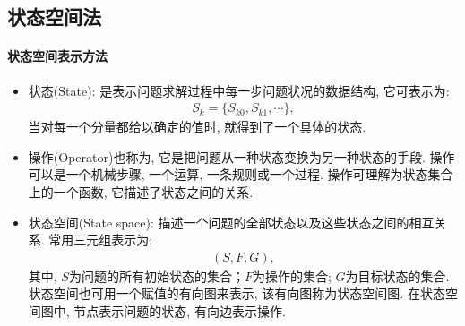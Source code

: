 \subsection{状态空间法}
\paragraph{状态空间表示方法}
\begin{itemize}
\item 状态(State): 是表示问题求解过程中每一步问题状况的数据结构, 它可表示为:
\begin{align}
  S_k=\{S_{k0}, S_{k1}, \cdots\},
\end{align}
当对每一个分量都给以确定的值时, 就得到了一个具体的状态.

\item 操作(Operator)也称为, 它是把问题从一种状态变换为另一种状态的手段.
操作可以是一个机械步骤, 一个运算, 一条规则或一个过程. 操作可理解为状态集合上的一个函数, 它描述了状态之间的关系.

\item 状态空间(State space): 描述一个问题的全部状态以及这些状态之间的相互关系. 常用三元组表示为:
\begin{align}
  (S, F, G),
\end{align}
其中, $S$为问题的所有初始状态的集合；$F$为操作的集合; $G$为目标状态的集合.
状态空间也可用一个赋值的有向图来表示, 该有向图称为状态空间图. 在状态空间图中, 节点表示问题的状态, 有向边表示操作.
\end{itemize}
